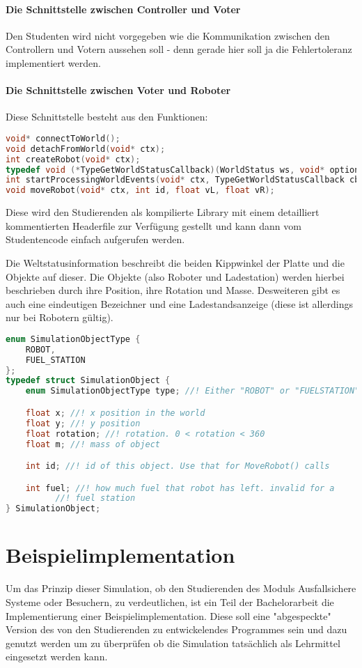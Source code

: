\paragraph{Die Schnittstelle zwischen Controller und Voter} Den Studenten wird nicht vorgegeben wie die Kommunikation zwischen den Controllern und Votern aussehen soll - denn gerade hier soll ja die Fehlertoleranz implementiert werden.

\paragraph{Die Schnittstelle zwischen Voter und Roboter} Diese Schnittstelle besteht aus den Funktionen:
\begin{lstlisting}[frame=single, language=c] 
void* connectToWorld();
void detachFromWorld(void* ctx);
int createRobot(void* ctx);
typedef void (*TypeGetWorldStatusCallback)(WorldStatus ws, void* optional);
int startProcessingWorldEvents(void* ctx, TypeGetWorldStatusCallback cb, void* optional);
void moveRobot(void* ctx, int id, float vL, float vR);
\end{lstlisting}

Diese wird den Studierenden als kompilierte Library mit einem detailliert kommentierten Headerfile zur Verf{\"{u}}gung gestellt und kann
dann vom Studentencode einfach aufgerufen werden.

Die Weltstatusinformation beschreibt die beiden Kippwinkel der Platte und die Objekte auf dieser. Die Objekte (also Roboter und Ladestation) werden hierbei beschrieben
durch ihre Position, ihre Rotation und Masse. Desweiteren gibt es auch eine eindeutigen Bezeichner und eine Ladestandsanzeige (diese ist allerdings nur bei Robotern
g{\"{u}}ltig).
\label{worldstatus} 
\begin{lstlisting}[frame=single, language=c]
enum SimulationObjectType {
	ROBOT,
	FUEL_STATION
};
typedef struct SimulationObject {
	enum SimulationObjectType type; //! Either "ROBOT" or "FUELSTATION"

	float x; //! x position in the world
	float y; //! y position
	float rotation; //! rotation. 0 < rotation < 360
	float m; //! mass of object

	int id; //! id of this object. Use that for MoveRobot() calls

	int fuel; //! how much fuel that robot has left. invalid for a
		  //! fuel station
} SimulationObject;
\end{lstlisting}

\clearpage
\section{Beispielimplementation}
Um das Prinzip dieser Simulation, ob den Studierenden des Moduls Ausfallsichere Systeme oder Besuchern, zu verdeutlichen, ist ein Teil der Bachelorarbeit die Implementierung einer
Beispielimplementation. Diese soll eine "abgespeckte" Version des von den Studierenden zu entwickelendes Programmes sein und dazu genutzt werden um zu {\"{u}}berpr{\"{u}}fen ob die
Simulation tats{\"{a}}chlich als Lehrmittel eingesetzt werden kann.

